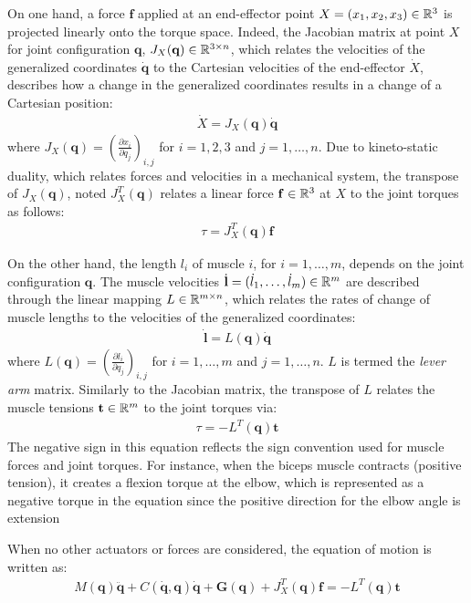 On one hand, a force $\mathbf{f}$ applied at an end-effector point $X = (x_1, x_2, x_3)\in \mathbb{R}^3$ is projected linearly onto the torque space. Indeed, the Jacobian matrix at point $X$ for joint configuration $\mathbf{q}$, $J_X(\mathbf{q})\in \mathbb{R}^{3\times n}$, which relates the velocities of the generalized coordinates $\dot{\mathbf{q}}$ to the Cartesian velocities of the end-effector $\dot{X}$, describes how a change in the generalized coordinates results in a change of a Cartesian position:
\begin{align*}
    \dot{X} = J_X(\mathbf{q})\dot{\mathbf{q}}
\end{align*}
where $J_X(\mathbf{q}) = \left(\frac{\partial x_i}{\partial q_j}\right)_{i,j}$ for $i=1,2,3$ and $j=1,\dots, n$. Due to kineto-static duality, which relates forces and velocities in a mechanical system, the transpose of $J_X(\mathbf{q})$, noted $J_X^T(\mathbf{q})$ relates a linear force $\mathbf{f}\in\mathbb{R}^3$ at $X$ to the joint torques as follows:
\begin{align*}
    \tau = J_X^T(\mathbf{q})\mathbf{f}
\end{align*}

On the other hand, the length $l_i$ of muscle $i$, for $i=1,\dots, m$, depends on the joint configuration $\mathbf{q}$. The muscle velocities $\dot{\mathbf{l}} = (\dot{l}_1, \dots, \dot{l}_m)\in \mathbb{R}^m$ are described through the linear mapping $L\in\mathbb{R}^{m\times n}$, which relates the rates of change of muscle lengths to the velocities of the generalized coordinates: 
\begin{align*}
    \dot{\mathbf{l}} = L(\mathbf{q})\dot{\mathbf{q}}
\end{align*}
where $L(\mathbf{q}) = \left(\frac{\partial l_i}{\partial q_j}\right)_{i,j}$ for $i=1,\dots, m$ and $j=1,\dots, n$. $L$ is termed the \emph{lever arm} matrix. Similarly to the Jacobian matrix, the transpose of $L$ relates the muscle tensions $\mathbf{t}\in\mathbb{R}^m$ to the joint torques via:
\begin{align*}
    \tau = -L^T(\mathbf{q})\mathbf{t}
\end{align*}
The negative sign in this equation reflects the sign convention used for muscle forces and joint torques. For instance, when the biceps muscle contracts (positive tension), it creates a flexion torque at the elbow, which is represented as a negative torque in the equation since the positive direction for the elbow angle is extension

When no other actuators or forces are considered, the equation of motion is written as:
\begin{align*}
    M(\mathbf{q})\ddot{\mathbf{q}} + C(\dot{\mathbf{q}}, \mathbf{q})\dot{\mathbf{q}} + \mathbf{G}(\mathbf{q}) + J_X^T(\mathbf{q})\mathbf{f} = -L^T(\mathbf{q})\mathbf{t}
\end{align*}

